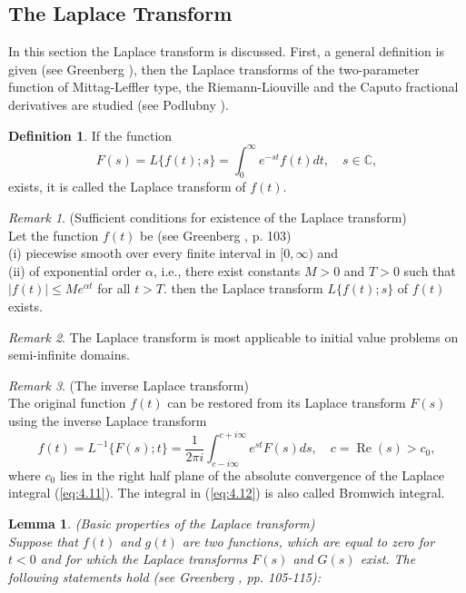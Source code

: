 \documentclass[a4paper,14pt,oneside]{book}
\theoremstyle{plain}
\newtheorem{lem}[thm]{Lemma}
\theoremstyle{definition}
\newtheorem{defn}{Definition}[section]
\theoremstyle{remark}
\newtheorem{rmk}{Remark}[section]
\begin{document}
\begin{center}
\begin{flushleft}
{\section{The Laplace Transform}
In this section the Laplace transform is discussed. First, a general definition is given (see Greenberg \cite{bb17}), then the Laplace transforms of the two-parameter function of Mittag-Leffler type, the Riemann-Liouville and the Caputo fractional derivatives are studied (see Podlubny \cite{bb22}).
\begin{defn}
If the function
\begin{equation}\label{eq:4.11}
F(s) =L\{f(t) ; s\} =\int_{0}^{\infty} e^{-s t} f(t) d t, \quad s \in \mathbb{C},
\end{equation}
exists, it is called the Laplace transform of $f(t)$.
\end{defn}
\begin{rmk}
(Sufficient conditions for existence of the Laplace transform)\\ Let the function $f(t)$ be (see Greenberg \cite{bb17}, p. 103)\\
(i) piecewise smooth over every finite interval in $[0, \infty)$ and\\
(ii) of exponential order $\alpha$, i.e., there exist constants $M>0$ and $T>0$ such that $|f(t)| \leq M e^{\alpha t}$ for all $t>T$. then the Laplace transform $L\{f(t) ; s\}$ of $f(t)$ exists.
\end{rmk}
\begin{rmk}
The Laplace transform is most applicable to initial value problems on semi-infinite domains.
\end{rmk}
\begin{rmk}
(The inverse Laplace transform)\\
The original function $f(t)$ can be restored from its Laplace transform $F(s)$ using the inverse Laplace transform
\begin{equation}\label{eq:4.12}
f(t)=L^{-1}\{F(s) ; t\} =\frac{1}{2 \pi i} \int_{c-i \infty}^{c+i \infty} e^{s t} F(s) d s, \quad c=\operatorname{Re}(s)>c_{0},
\end{equation}
where $c_{0}$ lies in the right half plane of the absolute convergence of the Laplace integral (\ref{eq:4.11}). The integral in (\ref{eq:4.12}) is also called Bromwich integral.
\end{rmk}
\begin{lem}
(Basic properties of the Laplace transform)\\
Suppose that $f(t)$ and $g(t)$ are two functions, which are equal to zero for $t<0$ and for which the Laplace transforms $F(s)$ and $G(s)$ exist. The following statements hold (see Greenberg \cite{bb17}, pp. 105-115):\\

\end{lem}}
\end{flushleft}
\end{center}
\end{document}
